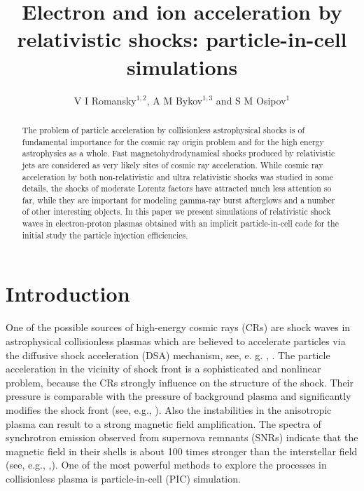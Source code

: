 \documentclass[a4paper]{jpconf}
\begin{document}
\title{Electron and ion acceleration by relativistic shocks: particle-in-cell simulations}

\author{V I Romansky$^{1,2}$, A M Bykov$^{1,3}$ and S M Osipov$^1$}

\address{$^1$ Ioffe Institute, 26 Politekhnicheskaya st., St. Petersburg 194021, Russia}
\address{$^2$
	Sternberg Astronomical Institute, Moscow State University
	Universitetsky pr., 13, Moscow 119234, Russia}
\address{$^3$ Peter the Great St.~Petersburg Polytechnic University, 29 Politekhnicheskaya st., St. Petersburg 195251, Russia}


\begin{abstract}
	The problem of particle acceleration by collisionless astrophysical shocks is of fundamental importance for the cosmic ray origin problem and  for the high energy astrophysics as a whole. Fast magnetohydrodynamical shocks produced by relativistic jets are considered as very likely sites of cosmic ray acceleration.
	While cosmic ray acceleration by both non-relativistic and ultra relativistic shocks was studied in some details, the shocks of moderate Lorentz factors have attracted much less attention so far, while they are important for modeling gamma-ray burst afterglows and a number of other interesting objects. In this paper we present simulations of relativistic shock waves in electron-proton plasmas obtained with an implicit particle-in-cell code for the initial study the particle injection efficiencies.
\end{abstract}
\section{Introduction}
One of the possible sources of high-energy cosmic rays (CRs) are shock waves in astrophysical collisionless plasmas which are believed to accelerate particles via  the diffusive shock acceleration (DSA) mechanism, see, e. g. \cite{Bell1978}, \cite{Blandford1978}. The particle acceleration in the vicinity of shock front is a sophisticated and nonlinear problem, because the CRs strongly influence on the structure of the shock. Their pressure is comparable with the pressure of background plasma and significantly modifies the shock front (see, e.g., \cite{Bykov2014}). 
Also the instabilities in the anisotropic plasma can result to a strong magnetic field amplification. The spectra of synchrotron emission observed from supernova remnants (SNRs) indicate that the magnetic field in their shells is about 100 times stronger than the interstellar field (see, e.g., \cite{Berezhko2003},\cite{Uchiyama2007}). 
One of the most powerful methods to explore the processes in collisionless plasma is particle-in-cell (PIC) simulation.
\end{document}
